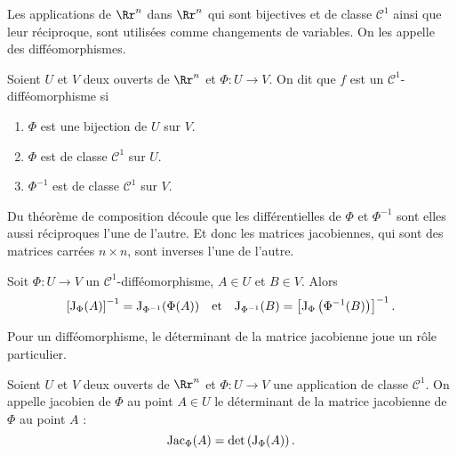 \documentclass[class=report,crop=false]{standalone}
\begin{document}
\thispagestyle{empty}

\vskip4mm

\noindent Les applications de $\Rr^n$ dans $\Rr^n$ qui sont bijectives et de classe $\mathscr{C}^1$ ainsi que leur réciproque, sont utilisées comme changements de variables. On les appelle des difféomorphismes.

\vskip6mm

\begin{definition}Soient $U$ et $V$ deux ouverts de $\Rr^n$ et $\Phi:U\to V$. On dit que $f$ est un ${\mathscr C}^1$-difféomorphisme si
\begin{enumerate}
\item $\Phi$ est une bijection de $U$ sur $V$.
\item $\Phi$ est de classe ${\mathscr C}^1$ sur $U$.
\item $\Phi^{-1}$ est de classe ${\mathscr C}^1$ sur $V$.
\end{enumerate}
\end{definition}

\vskip4mm

\noindent Du théorème de composition découle que les différentielles de $\Phi$ et $\Phi^{-1}$ sont elles aussi réciproques l'une de l'autre. Et donc les matrices jacobiennes, qui sont des matrices carrées $n\times n$, sont inverses l'une de l'autre.

\vskip6mm

\begin{proposition}Soit $\Phi:U\to V$ un ${\mathscr C}^1$-difféomorphisme, $A\in U$ et $B\in V$. Alors
$$\left[\mathrm{J} _{\Phi}(A)\right]^{-1}=\mathrm{J} _{\Phi ^{-1}}(\Phi(A))\quad \mbox{et}\quad \mathrm{J} _{\Phi ^{-1}}(B)=\left[\mathrm{J} _{\Phi}\left(\Phi^{-1}(B)\right)\right]^{-1}.$$
\end{proposition}

\vskip4mm

\noindent Pour un difféomorphisme, le déterminant de la matrice jacobienne joue un r\^ole particulier.

\vskip6mm

\begin{definition}Soient $U$ et $V$ deux ouverts de $\Rr^n$ et $\Phi:U\to V$ une application de classe ${\mathscr C}^1$. On appelle jacobien de $\Phi$ au point $A\in U$ le déterminant de la matrice jacobienne de $\Phi$ au point $A$ :
$$\mathrm{Jac} _{\Phi}(A)=\det \left(\mathrm{J} _{\Phi}(A)\right).$$
\end{definition}

\vskip4mm
\end{document}
